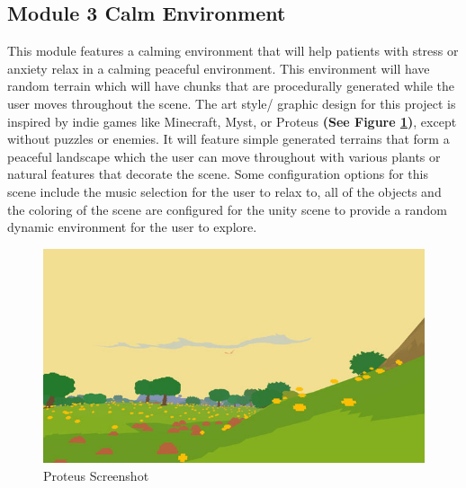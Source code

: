 \documentclass[a4paper,10pt]{article}
\begin{document}
\subsection{Module 3 Calm Environment}
This module features a calming environment that will help patients with stress or anxiety relax in a calming peaceful environment. This environment will have random terrain which will have chunks that are procedurally generated while the user moves throughout the scene.  The art style/ graphic design for this project is inspired by indie games like Minecraft, Myst, or Proteus \textbf{(See Figure \ref{fig:proteus})}, except without puzzles or enemies. It will feature simple generated terrains that form a  peaceful landscape which the user can move throughout with various plants or natural features that decorate the scene.  Some configuration options for this scene include the music selection for the user to relax to, all of the objects and the coloring of the scene are configured for the unity scene to provide a random dynamic environment for the user to explore.

\begin{figure}[H]
	\centerline{\includegraphics[scale= 0.4]{proteus.jpg}}
	\caption{Proteus Screenshot}
	\label{fig:proteus}
\end{figure}
\end{document}
